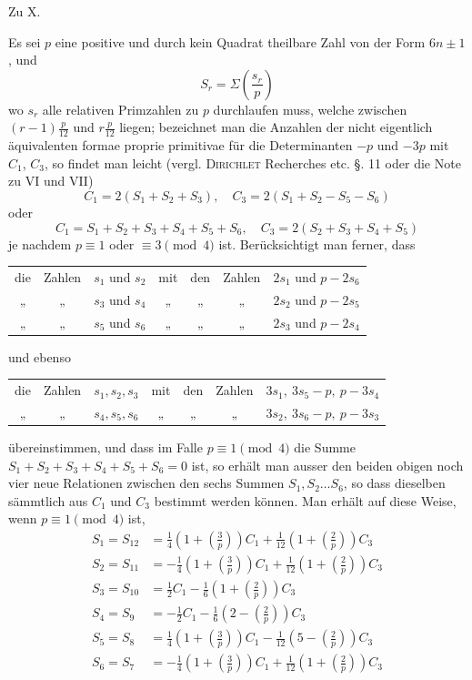 \begin{center}\large Zu X.\end{center}

Es sei $p$ eine positive und durch kein Quadrat theilbare Zahl von der Form $6n\pm1$, und
\[
S_r=\Sigma\left(\frac{s_r}p\right)
\]
wo $s_r$ alle relativen Primzahlen zu $p$ durchlaufen muss, welche zwischen $(r-1)\frac p{12}$ und $r\frac p{12}$ liegen; bezeichnet man die Anzahlen der nicht eigentlich äquivalenten formae proprie primitivae für die Determinanten $-p$ und $-3p$ mit $C_1$, $C_3$, so findet man leicht (vergl. \textsc{Dirichlet} Recherches etc. §. 11 oder die Note zu VI und VII)
\[
C_1=2(S_1+S_2+S_3),\quad C_3=2(S_1+S_2-S_5-S_6)
\]
oder
\[
C_1=S_1+S_2+S_3+S_4+S_5+S_6,\quad C_3=2(S_2+S_3+S_4+S_5)
\]
je nachdem $p\equiv1$ oder $\equiv3\pmod4$ ist. Berücksichtigt man ferner, dass
\begin{center}\small
\begin{tabular}{@{}ccccccl@{}}
die&Zahlen&$s_1$ und $s_2$&mit&den&Zahlen&$2s_1$ und $p-2s_6$\\
„&„&$s_3$ und $s_4$&„&„&„&$2s_2$ und $p-2s_5$\\
„&„&$s_5$ und $s_6$&„&„&„&$2s_3$ und $p-2s_4$
\end{tabular}
\end{center}
und ebenso
\begin{center}\small
\begin{tabular}{@{}ccccccl@{}}
die&Zahlen&$s_1,s_2,s_3$&mit&den&Zahlen&$3s_1,\ 3s_5-p,\ p-3s_4$\\
„&„&$s_4,s_5,s_6$&„&„&„&$3s_2,\ 3s_6-p,\ p-3s_3$
\end{tabular}
\end{center}
übereinstimmen, und dass im Falle $p\equiv1\pmod4$ die Summe $S_1+S_2+S_3+S_4+S_5+S_6=0$ ist, so erhält man ausser den beiden obigen noch vier neue Relationen zwischen den sechs Summen $S_1,S_2\ldots S_6$, so dass dieselben sämmtlich aus $C_1$ und $C_3$ bestimmt werden können. Man erhält auf diese Weise, wenn $p\equiv1\pmod4$ ist,
\[
\begin{aligned}
S_1=S_{12}&=\tfrac14\left(1+\left(\frac3p\right)\right)C_1+\tfrac1{12}\left(1+\left(\frac2p\right)\right)C_3\\
S_2=S_{11}&=-\tfrac14\left(1+\left(\frac3p\right)\right)C_1+\tfrac1{12}\left(1+\left(\frac2p\right)\right)C_3\\
S_3=S_{10}&=\tfrac12C_1-\tfrac16\left(1+\left(\frac2p\right)\right)C_3\\
S_4=S_9&=-\tfrac12C_1-\tfrac16\left(2-\left(\frac2p\right)\right)C_3\\
S_5=S_8&=\tfrac14\left(1+\left(\frac3p\right)\right)C_1-\tfrac1{12}\left(5-\left(\frac2p\right)\right)C_3\\
S_6=S_7&=-\tfrac14\left(1+\left(\frac3p\right)\right)C_1+\tfrac1{12}\left(1+\left(\frac2p\right)\right)C_3
\end{aligned}
\]
